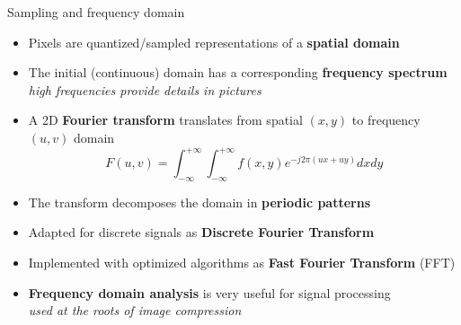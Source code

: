 \begin{frame}{Sampling and frequency domain}
  \begin{itemize}
  \item Pixels are quantized/sampled representations of a \textbf{spatial domain}
  \item The initial (continuous) domain has a corresponding \textbf{frequency spectrum}\\
    \textit{high frequencies provide details in pictures}
  \item A 2D \textbf{Fourier transform} translates from spatial \((x,y)\) to frequency \((u,v)\) domain
\[
F(u,v) = \int_{-\infty}^{+\infty} \int_{-\infty}^{+\infty} f(x,y)e^{-j2\pi(ux+uy)}dxdy
\]
  \item The transform decomposes the domain in \textbf{periodic patterns}
  \item Adapted for discrete signals as \textbf{Discrete Fourier Transform}
  \item Implemented with optimized algorithms as \textbf{Fast Fourier Transform} (FFT)
  \item \textbf{Frequency domain analysis} is very useful for signal processing\\
    \textit{used at the roots of image compression}
  \end{itemize}
\end{frame}

